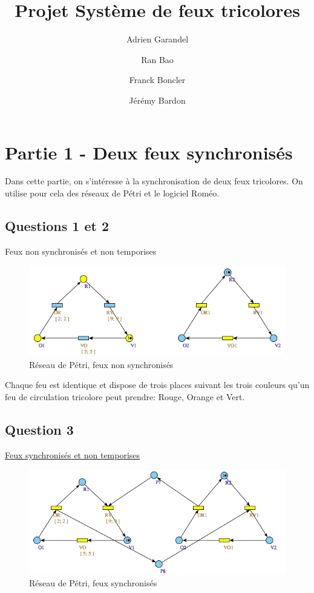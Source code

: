 \documentclass[pdftex,12pt,a4paper]{article}
\title{Projet Système de feux tricolores}
\author{Adrien Garandel \and Ran Bao \and Franck Boncler \and Jérémy Bardon}
\begin{document}
\maketitle
\tableofcontents
\newpage

\section{Partie 1 - Deux feux synchronisés}
Dans cette partie, on s'intéresse à la synchronisation de deux feux tricolores. On utilise pour cela des réseaux de Pétri et le logiciel Roméo.

\subsection{Questions 1 et 2}
Feux non synchronisés et non temporises

\begin{figure}[H]
	\centering
	\includegraphics[scale=0.5]{ressources/part1/Q2.png}
	\caption{Réseau de Pétri, feux non synchronisés}
\end{figure}

Chaque feu est identique et dispose de trois places suivant les trois couleurs qu'un feu de circulation tricolore peut prendre: Rouge, Orange et Vert.

\subsection{Question 3}

\href{https://github.com/masters-info-nantes/hong-cheng-lv/blob/master/ressources/part1/Q3-FeuxSynchro.xml}{Feux
synchronisés et non temporises}

\begin{figure}[H]
	\centering
	\includegraphics[scale=0.5]{ressources/part1/Q3.png}
	\caption{Réseau de Pétri, feux synchronisés}
\end{figure}
\end{document}
